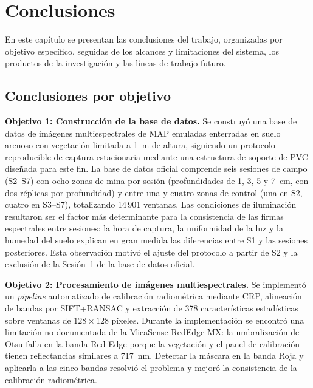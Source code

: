\chapter{Conclusiones}
\label{cap:conclusiones}

En este capítulo se presentan las conclusiones del trabajo, organizadas
por objetivo específico, seguidas de los alcances y limitaciones del sistema,
los productos de la investigación y las líneas de trabajo futuro.

\section{Conclusiones por objetivo}

\textbf{Objetivo 1: Construcción de la base de datos.}
Se construyó una base de datos de imágenes multiespectrales de \ac{MAP}
emuladas enterradas en suelo arenoso con vegetación limitada a \SI{1}{m}
de altura, siguiendo un protocolo reproducible de captura estacionaria mediante
una estructura de soporte de \ac{PVC} diseñada para este fin. La base de datos oficial
comprende seis sesiones de campo (S2--S7) con ocho zonas de mina por sesión
(profundidades de 1, 3, 5 y 7~cm, con dos réplicas por profundidad) y entre
una y cuatro zonas de control (una en S2, cuatro en S3--S7), totalizando
14\,901 ventanas. Las condiciones de iluminación resultaron ser el factor más determinante
para la consistencia de las firmas espectrales entre sesiones: la hora de
captura, la uniformidad de la luz y la humedad del suelo explican en gran
medida las diferencias entre S1 y las sesiones posteriores. Esta observación
motivó el ajuste del protocolo a partir de S2 y la exclusión de la Sesión~1
de la base de datos oficial.

\textbf{Objetivo 2: Procesamiento de imágenes multiespectrales.}
Se implementó un \textit{pipeline} automatizado de calibración radiométrica
mediante \ac{CRP}, alineación de bandas por \ac{SIFT}+RANSAC y extracción de
378 características estadísticas sobre ventanas de $128\times128$ píxeles. Durante la implementación se encontró una limitación no documentada
de la MicaSense RedEdge-MX: la umbralización de Otsu falla en la banda
Red Edge porque la vegetación y el panel de calibración tienen reflectancias
similares a \SI{717}{nm}. Detectar la máscara en la banda Roja y aplicarla
a las cinco bandas resolvió el problema y mejoró la consistencia de la
calibración radiométrica.

